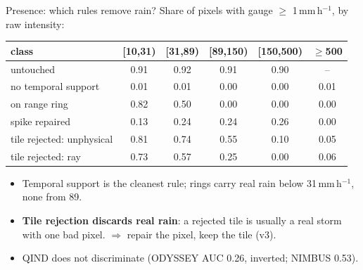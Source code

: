 \documentclass[aspectratio=169,10pt]{beamer}
\newcommand{\mmh}{\,mm\,h$^{-1}$}
\begin{document}
\begin{frame}{Presence: which rules remove rain?}
  \footnotesize
  Share of pixels with gauge $\ge$ 1\mmh, by raw intensity:
  \vspace{1mm}

  \centering
  \begin{tabular}{lccccc}
    \toprule
    class & [10,31) & [31,89) & [89,150) & [150,500) & $\ge$500 \\
    \midrule
    untouched & 0.91 & 0.92 & 0.91 & 0.90 & -- \\
    no temporal support & 0.01 & 0.01 & 0.00 & 0.00 & 0.01 \\
    on range ring & 0.82 & 0.50 & 0.00 & 0.00 & 0.00 \\
    spike repaired & 0.13 & 0.24 & 0.24 & 0.26 & 0.00 \\
    tile rejected: unphysical & 0.81 & 0.74 & 0.55 & 0.10 & 0.05 \\
    tile rejected: ray & 0.73 & 0.57 & 0.25 & 0.00 & 0.06 \\
    \bottomrule
  \end{tabular}
  \vspace{2mm}

  \raggedright\small
  \begin{itemize}
    \item Temporal support is the cleanest rule; rings carry real rain below 31\mmh, none
      from 89.
    \item \textbf{Tile rejection discards real rain}: a rejected tile is usually a real storm
      with one bad pixel. $\Rightarrow$ repair the pixel, keep the tile (v3).
    \item QIND does not discriminate (ODYSSEY AUC 0.26, inverted; NIMBUS 0.53).
  \end{itemize}
\end{frame}
\end{document}
